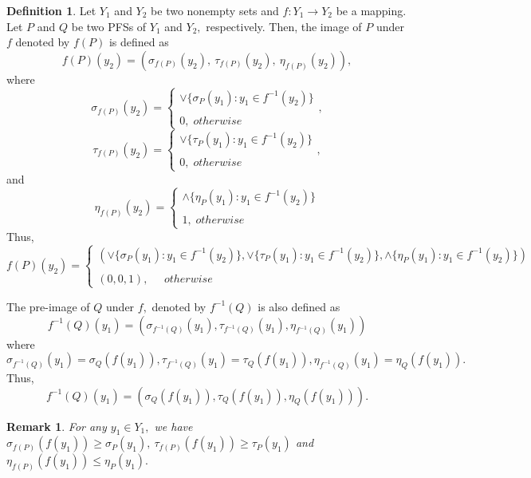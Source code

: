 \documentclass[12pt,letterpaper]{amsart}
\theoremstyle{plain}
\newtheorem{remark}{Remark}[section]
\theoremstyle{definition}
\newtheorem{definition}{Definition}[section]
\numberwithin{equation}{section}
\begin{document}
\begin{definition}\cite{t4}
Let $Y_1$ and $Y_2$ be two nonempty sets and $f:Y_1 \rightarrow Y_2$ be a mapping. Let $P$ and $Q$ be two PFSs of $Y_1$ and $Y_2,$ respectively. Then, the image of $P$ under $f$ denoted by $f(P)$ is defined as $$f(P)(y_2) = (\sigma_{f(P)}(y_2),~ \tau_{f(P)}(y_2),~ \eta_{f(P)}(y_2)),$$ where
$$\sigma_{f(P)}(y_2) = \left\{\begin{array}{ll} \vee\{\sigma_P(y_1): y_1 \in  f^{-1}(y_2)\} \\
\ \\

0,\; otherwise \end{array}\right.,$$
$$\tau_{f(P)}(y_2) = \left\{\begin{array}{ll} \vee\{\tau_P(y_1): y_1 \in  f^{-1}(y_2)\} \\
\ \\
		
0,\; otherwise \end{array}\right.,$$ and
$$\eta_{f(P)}(y_2) = \left\{\begin{array}{ll} \wedge\{\eta_P(y_1): y_1 \in  f^{-1}(y_2)\} \\
\ \\
		
1,\; otherwise \end{array}\right.$$
Thus, $$f(P)(y_2) = \left\{\begin{array}{ll} (\vee\{\sigma_P(y_1): y_1 \in  f^{-1}(y_2)\}, \vee\{\tau_P(y_1): y_1 \in  f^{-1}(y_2)\}, \wedge\{\eta_P(y_1): y_1 \in  f^{-1}(y_2)\} )\\
\ \\
		
(0,0,1), \; \; \; \; \;  otherwise 
\end{array}\right.$$

The pre-image of $Q$ under $f,$ denoted by $f^{-1}(Q)$ is also defined as $$f^{-1}(Q)(y_1) = (\sigma_{f^{-1}(Q)}(y_1), \tau_{f^{-1}(Q)}(y_1), \eta_{f^{-1}(Q)}(y_1))$$ where $$\sigma_{f^{-1}(Q)}(y_1) = \sigma_Q(f(y_1)), \tau_{f^{-1}(Q)}(y_1) = \tau_Q(f(y_1)), \eta_{f^{-1}(Q)}(y_1) = \eta_Q(f(y_1)).$$ Thus, $$f^{-1}(Q)(y_1) = (\sigma_Q(f(y_1)), \tau_Q(f(y_1)), \eta_Q(f(y_1))).$$
\end{definition}

\begin{remark} \cite{t4}
For any $y_1 \in Y_1,$ we have $\sigma_{f(P)}(f(y_1)) \geq \sigma_P(y_1),~\tau_{f(P)}(f(y_1)) \geq \tau_P(y_1)$ and $\eta_{f(P)}(f(y_1)) \leq \eta_P(y_1).$
\end{remark}
\end{document}
